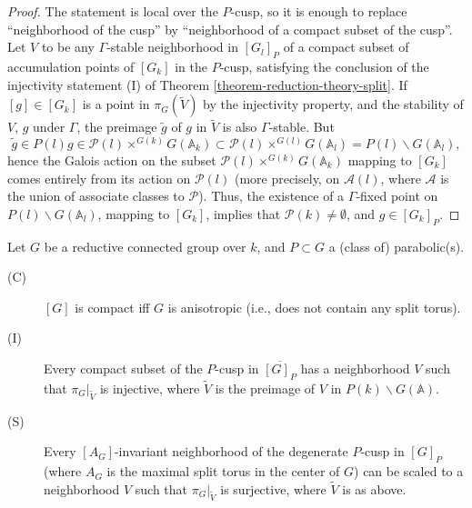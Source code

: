 \begin{proof}
The statement is local over the $P$-cusp, so it is enough to replace ``neighborhood of the cusp'' by ``neighborhood of a compact subset of the cusp''. Let $V$ to be any $\Gamma$-stable neighborhood in $[G_l]_P$ of a compact subset of accumulation points of $[G_k]$ in the $P$-cusp, satisfying the conclusion of the injectivity statement (I) of Theorem \ref{theorem-reduction-theory-split}. If $[g]\in [G_k]$ is a point in $\pi_G(\tilde V)$ by the injectivity property, and the stability of $V$, $g$ under $\Gamma$, the preimage $\tilde g$ of $g$ in $\tilde V$ is also $\Gamma$-stable. But 
$$\tilde g \in P(l)g \in \mathcal P(l)\times^{G(k)}G(\mathbb A_k)\subset \mathcal P(l)\times^{G(l)}G(\mathbb A_l) = P(l)\backslash G(\mathbb A_l),$$
hence the Galois action on the subset $\mathcal P(l)\times^{G(k)}G(\mathbb A_k)$ mapping to $[G_k]$ comes entirely from its action on $\mathcal P(l)$ (more precisely, on $\mathcal A(l)$, where $\mathcal A$ is the union of associate classes to $\mathcal P$). Thus, the existence of a $\Gamma$-fixed point on $P(l)\backslash G(\mathbb A_l)$, mapping to $[G_k]$, implies that $\mathcal P(k) \ne \emptyset$, and $g\in [G_k]_P$.
\end{proof}




\begin{theorem}
 \label{theorem-reduction-theory-general}
Let $G$ be a reductive connected group over $k$, and $P\subset G$ a (class of) parabolic(s).
 \begin{description}
  \item[(C)] $[G]$ is compact iff $G$ is anisotropic (i.e., does not contain any split torus). 
  \item[(I)] Every compact subset of the $P$-cusp in $\overline{[G]_P}$ has a neighborhood $V$ such that $\pi_G|_{\tilde V}$ is injective, where $\tilde V$ is the preimage of $V$ in $P(k)\backslash G(\mathbb A)$.
  \item[(S)] Every $[A_G]$-invariant neighborhood of the degenerate $P$-cusp in $[G]_P$ (where $A_G$ is the maximal split torus in the center of $G$) can be scaled to a neighborhood $V$ such that $\pi_G|_{\tilde V}$ is surjective, where $\tilde V$ is as above. 
 \end{description}
\end{theorem}


